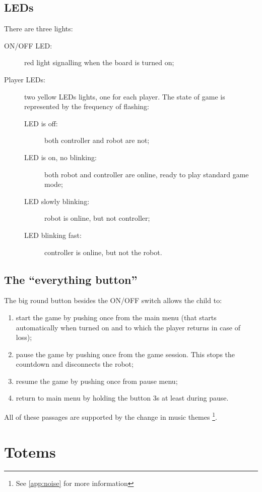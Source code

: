 \documentclass[a4paper,twoside]{book}
\begin{document}
\subsection{LEDs}

\beforelist There are three lights:
\begin{description}
\item[ON/OFF LED:] red light signalling when the board is turned on;
\item[Player LEDs:] two yellow LEDs lights, one for each player. The state of game is represented by the frequency of flashing:
  \begin{description}
  \item[LED is off:] both controller and robot are not;
  \item[LED is on, no blinking:] both robot and controller are online, ready to play standard game mode;
  \item[LED slowly blinking:] robot is online, but not controller;
  \item[LED blinking fast:] controller is online, but not the robot.
  \end{description}
\end{description}
\afterlist*

\subsection{The \textquotedblleft{}everything button\textquotedblright{}}

\beforelist The big round button besides the ON/OFF switch allows the child to:
\begin{enumerate}
\item start the game by pushing once from the main menu (that starts automatically when turned on and to which the player returns in case of loss);
\item pause the game by pushing once from the game session. This stops the countdown and disconnects the robot;
\item resume the game by pushing once from pause menu;
\item return to main menu by holding the button 3s at least during pause.
\end{enumerate}
\afterlist
All of these passages are supported by the change in music themes 
\footnote {See \autoref{app:noise} for more information}.


\section{Totems}
\end{document}
